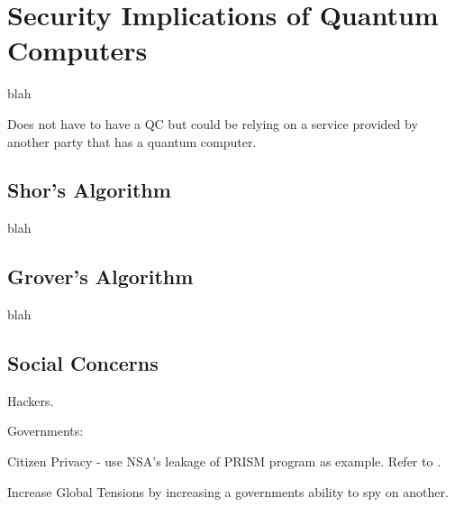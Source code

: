 \section{Security Implications of Quantum Computers}
blah

Does not have to have a QC but could be relying on a service provided by another party that has a quantum computer.

\subsection{Shor's Algorithm}
blah

\subsection{Grover's Algorithm}
blah

\subsection{Social Concerns}
Hackers.

Governments:

Citizen Privacy - use NSA's leakage of PRISM program as example. Refer to \cite{secrisk}.
    
Increase Global Tensions by increasing a governments ability to spy on another. 

    